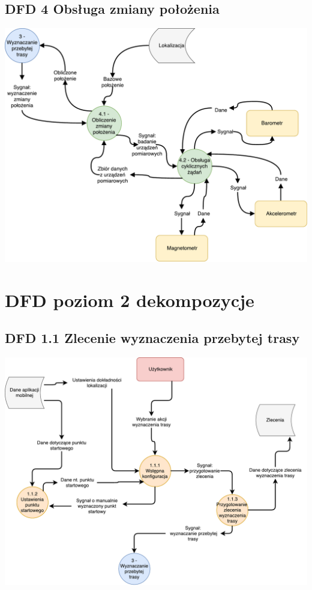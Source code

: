 \documentclass[11pt]{article}
\begin{document}
	\subsection{DFD 4 Obsługa zmiany położenia}
	\begin{center}
		\includegraphics[scale=0.7]{DFD4.pdf}
	\end{center}
	\newpage
	\section{DFD poziom 2 dekompozycje}
	\subsection{DFD 1.1 Zlecenie wyznaczenia przebytej trasy }
	\begin{center}
		\includegraphics[scale=0.6]{DFD11.pdf}
	\end{center}
\end{document}

